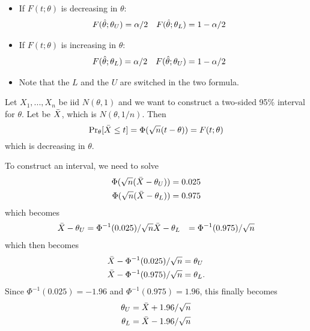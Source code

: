\begin{itemize}
  \begin{itemize}
  \item If $F(t; \theta)$ is decreasing in $\theta$:
    \begin{align*}
      F(\hat{\theta}; \theta_U) &= \alpha/2 & F(\hat{\theta}; \theta_L) &= 1 - \alpha/2
    \end{align*}
  \item If $F(t; \theta)$ is increasing in $\theta$:
    \begin{align*}
      F(\hat{\theta}; \theta_L) &= \alpha/2 & F(\hat{\theta}; \theta_U) &= 1 - \alpha/2
    \end{align*}
  \item Note that the $L$ and the $U$ are switched in the two formula.
  \end{itemize}

  \begin{ex} Let $X_1,...,X_n$ be iid $N(\theta, 1)$ and we want to
    construct a two-sided 95\% interval for $\theta$.  Let be $\bar{X}$, which
    is $N(\theta, 1/n)$.  Then
    \begin{equation*}
      \operatorname{Pr}_\theta[\bar{X} \leq t] = \Phi(\sqrt{n} (t - \theta)) = F(t; \theta)
    \end{equation*}
    which is decreasing in $\theta$.

    To construct an interval, we need to solve
    \begin{align*}
      \Phi(\sqrt{n} (\bar{X} - \theta_U)) &= 0.025 \\
      \Phi(\sqrt{n} (\bar{X} - \theta_L)) &= 0.975
    \end{align*}
    which becomes
    \begin{align*}
      \bar{X} - \theta_U &= \Phi^{-1}(0.025) / \sqrt{n}
      \bar{X} - \theta_L &= \Phi^{-1}(0.975) / \sqrt{n}
    \end{align*}
    which then becomes
    \begin{align*}
      \bar{X} - \Phi^{-1}(0.025) / \sqrt{n} &= \theta_U \\
      \bar{X} - \Phi^{-1}(0.975) / \sqrt{n} &= \theta_L.
    \end{align*}
    Since $\Phi^{-1}(0.025) = -1.96$ and $\Phi^{-1}(0.975) = 1.96$, this
    finally becomes
    \begin{align*}
      \theta_U &= \bar{X} + 1.96 / \sqrt{n} \\
      \theta_L &= \bar{X} - 1.96 / \sqrt{n}
    \end{align*}
  \end{ex}

\end{itemize}

